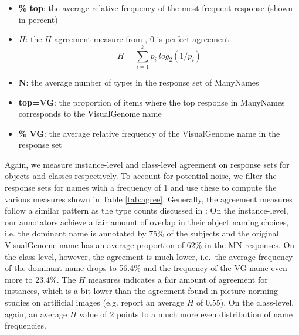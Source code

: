 \begin{itemize}
\item \textbf{\% top}: the average relative frequency of the most frequent response (shown in percent)
\item \textbf{$H$}: the $H$ agreement measure from \cite{snodgrass}, 0 is perfect agreement 
\begin{equation}
H = \sum_{i=1}^k p_i\ log_2(1/p_i)
\end{equation}

\item \textbf{N}: the average number of types in the response set of ManyNames
\item \textbf{top=VG}: the proportion of items where the top response in ManyNames corresponds to the VisualGenome name
\item \textbf{\% VG}: the average relative frequency of the VisualGenome name in the response set

\end{itemize}

Again, we measure instance-level and class-level agreement on response sets for objects and classes respectively.
To account for potential noise, we filter the response sets for names with a frequency of 1 and use these to compute
the various measures shown in Table \ref{tab:agree}.
Generally, the agreement measures follow a similar pattern as the type counts discussed in \label{subsec:counts}:
On the instance-level, our annotators achieve a fair amount of overlap in their object naming choices, i.e. the dominant name is annotated by 75\% of the subjects and the original VisualGenome name has an average proportion of 62\% in the MN responses. On the class-level, however, the agreement is much lower, i.e.\ the average frequency of the dominant name drops to 56.4\% and the frequency of the VG name even more to 23.4\%. The $H$ measures indicates a fair amount of agreement for instances, which is a bit lower than the agreement found in picture norming studies on artificial images (e.g. \cite{snodgrass} report an average $H$ of 0.55). On the class-level, again, an average $H$ value of 2 points to a much more even distribution of name frequencies.


